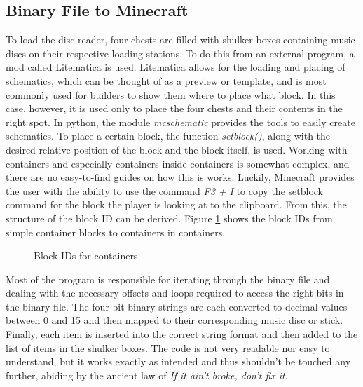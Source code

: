 \subsection{Binary File to Minecraft}
To load the disc reader, four chests are filled with shulker boxes containing music discs on their respective loading stations. To do this from an external program, a mod called Litematica is used. Litematica allows for the loading and placing of schematics, which can be thought of as a preview or template, and is most commonly used for builders to show them where to place what block. In this case, however, it is used only to place the four chests and their contents in the right spot. In python, the module \textit{mcschematic} provides the tools to easily create schematics. To place a certain block, the function \textit{setblock()}, along with the desired relative position of the block and the block itself, is used. Working with containers and especially containers inside containers is somewhat complex, and there are no easy-to-find guides on how this is works. Luckily, Minecraft provides the user with the ability to use the command \textit{F3 + I} to copy the setblock command for the block the player is looking at to the clipboard. From this, the structure of the block ID can be derived. Figure \ref{fig::minecraftChest} \space shows the block IDs from simple container blocks to containers in containers.
\begin{figure}[h!]
    
    \caption{Block IDs for containers}
    \label{fig::minecraftChest}
\end{figure}

Most of the program is responsible for iterating through the binary file and dealing with the necessary offsets and loops required to access the right bits in the binary file. The four bit binary strings are each converted to decimal values between 0 and 15 and then mapped to their corresponding music disc or stick. Finally, each item is inserted into the correct string format and then added to the list of items in the shulker boxes. The code is not very readable nor easy to understand, but it works exactly as intended and thus shouldn't be touched any further, abiding by the ancient law of \textit{If it ain't broke, don't fix it}.
